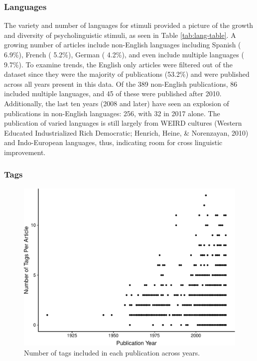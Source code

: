 \documentclass[english,,man]{apa6}
\theoremstyle{definition}
\theoremstyle{definition}
\theoremstyle{definition}
\theoremstyle{remark}
\begin{document}
\hypertarget{languages}{%
\subsubsection{Languages}\label{languages}}

The variety and number of languages for stimuli provided a picture of
the growth and diversity of psycholinguistic stimuli, as seen in Table
\ref{tab:lang-table}. A growing number of articles include non-English
languages including Spanish ( 6.9\%), French ( 5.2\%), German ( 4.2\%),
and even include multiple languages ( 9.7\%). To examine trends, the
English only articles were filtered out of the dataset since they were
the majority of publications (53.2\%) and were published across all
years present in this data. Of the 389 non-English publications, 86
included multiple languages, and 45 of these were published after 2010.
Additionally, the last ten years (2008 and later) have seen an explosion
of publications in non-English languages: 256, with 32 in 2017 alone.
The publication of varied languages is still largely from WEIRD cultures
(Western Educated Industrialized Rich Democratic; Henrich, Heine, \&
Norenzayan, 2010) and Indo-European languages, thus, indicating room for
cross linguistic improvement.

\hypertarget{tags}{%
\subsubsection{Tags}\label{tags}}

\begin{figure}
\centering
\includegraphics{LAB_files/figure-latex/tag-fig-1.pdf}
\caption{\label{fig:tag-fig}Number of tags included in each publication
across years.}
\end{figure}
\end{document}

